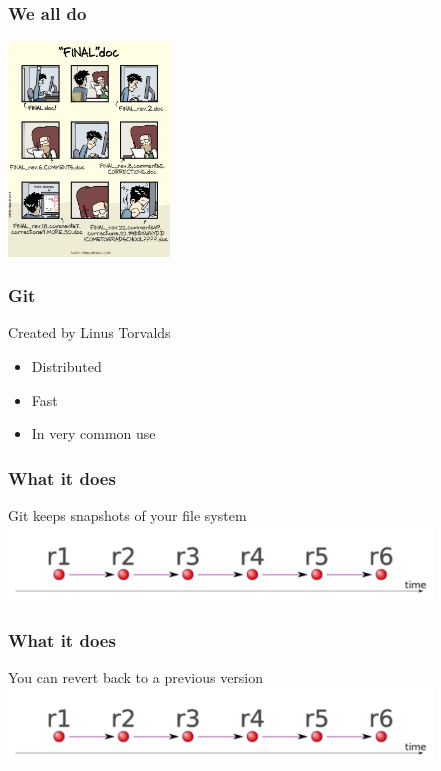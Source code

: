 \documentclass{beamer}
\begin{document}
\begin{frame}
\frametitle{We all do}
 \includegraphics[height=5.7cm]{figures/vcs_for_science.png}
\end{frame}



\begin{frame}
\frametitle{Git}
Created by Linus Torvalds
\begin{itemize}
\pause
\item
Distributed
\pause
\item
Fast 
\pause
\item
In very common use
\end{itemize}
\end{frame}

\begin{frame}
\frametitle{What it does}
Git keeps snapshots of your file system
\includegraphics[height=2cm]{figures/git1.pdf}
\end{frame}

\begin{frame}
\frametitle{What it does}
You can revert back to a previous version
\includegraphics[height=2cm]{figures/git1.pdf}
\end{frame}
\end{document}

